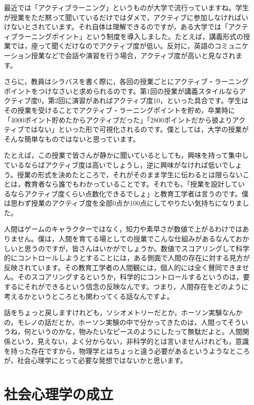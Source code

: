 \documentclass{ltjsbook}
\begin{document}
最近では「アクティブラーニング」というものが大学で流行っていますね。学生が授業をただ黙って聞いているだけではダメで，アクティブに参加しなければいけないとされています。それ自体は理解できるのですが，ある大学では「アクティブラーニングポイント」という制度を導入しました。たとえば，講義形式の授業では，座って聞くだけなのでアクティブ度が低い。反対に，英語のコミュニケーション授業などで会話や演習を行う場合，アクティブ度が高いと見なされます。

さらに，教員はシラバスを書く際に，各回の授業ごとにアクティブ・ラーニングポイントをつけなさいと求められるのです。第1回の授業が講義スタイルならアクティブ度0，第2回に演習があればアクティブ度10，といった具合です。学生はその授業を受けることでアクティブ・ラーニングポイントを貯め，卒業時に「4000ポイント貯めたからアクティブだった」「2800ポイントだから彼よりアクティブではない」といった形で可視化されるのです。僕としては，大学の授業がそんな簡単なものではないと思っています。

たとえば，この授業で皆さんが静かに聞いているとしても，興味を持って集中しているならばアクティブ度は高いでしょうし，逆に興味がなければ低いでしょう。授業の形式を決めたところで，それがそのまま学生に伝わるとは限らないことは，教育者なら誰でもわかっていることです。それでも，「授業を設計しているならアクティブ度くらい点数化できるでしょ」と教育工学者は言うのです。僕は思わず授業のアクティブ度を全部0点か100点にしてやりたい気持ちになりました。

人間はゲームのキャラクターではなく，知力や素早さが数値で上がるわけではありません。僕は，人間を育てる場としての授業でこんな仕組みがあるなんておかしいと思うのですが，皆さんはいかがでしょうか。数値でスコアリングして科学的にコントロールしようとすることには，ある側面で人間の存在に対する見方が反映されています。その教育工学者の人間観には，個人的には全く賛同できません。そのスコアリングするというか，科学的にコントロールするというのは，要するにそれができるという信念の反映なんです。つまり，人間存在をどのように考えるかというところとも関わってくる話なんですよ。



話をちょっと戻しますけれども，ソシオメトリーだとか，ホーソン実験なんかの，モレノの話だとか，ホーソン実験の中で分かってきたのは，人間ってそういうね，何というのかな，物みたいなピースのようにしたって無駄だよと。人間関係という，見えない，よく分からない，非科学的とは言いませんけれども，意識を持った存在ですから，物理学とはちょっと違う必要があるというようなところが，社会心理学にとって必要な発想ではないかと思います。
\section{社会心理学の成立}
\end{document}
